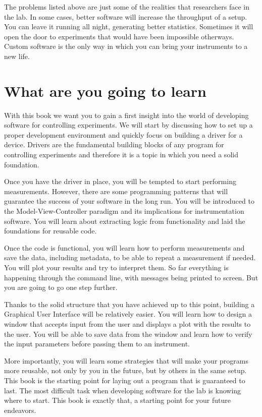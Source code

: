 The problems listed above are just some of the realities that researchers face in the lab. In some cases, better software will increase the throughput of a setup. You can leave it running all night, generating better statistics. Sometimes it will open the door to experiments that would have been impossible otherways. Custom software is the only way in which you can bring your instruments to a new life. 

\section{What are you going to learn}
With this book we want you to gain a first insight into the world of developing software for controlling experiments. We will start by discussing how to set up a proper development environment and quickly focus on building a driver for a device. Drivers are the fundamental building blocks of any program for controlling experiments and therefore it is a topic in which you need a solid foundation. 

Once you have the driver in place, you will be tempted to start performing measurements. However, there are some programming patterns that will guarantee the success of your software in the long run. You will be introduced to the Model-View-Controller paradigm and its implications for instrumentation software. You will learn about extracting logic from functionality and laid the foundations for reusable code. 

Once the code is functional, you will learn how to perform measurements and save the data, including metadata, to be able to repeat a measurement if needed. You will plot your results and try to interpret them. So far everything is happening through the command line, with messages being printed to screen. But you are going to go one step further. 

Thanks to the solid structure that you have achieved up to this point, building a Graphical User Interface will be relatively easier. You will learn how to design a window that accepts input from the user and displays a plot with the results to the user. You will be able to save data from the window and learn how to verify the input parameters before passing them to an instrument. 

More importantly, you will learn some strategies that will make your programs more reusable, not only by you in the future, but by others in the same setup. This book is the starting point for laying out a program that is guaranteed to last. The most difficult task when developing software for the lab is knowing where to start. This book is exactly that, a starting point for your future endeavors.

